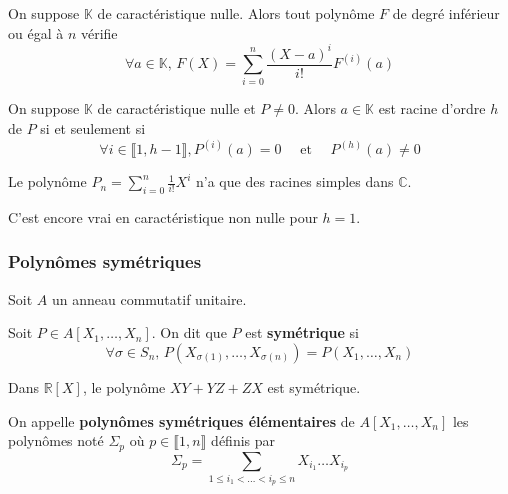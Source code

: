   \begin{theorem}
    On suppose $\mathbb{K}$ de caractéristique nulle. Alors tout polynôme $F$ de degré inférieur ou égal à $n$ vérifie
    \[ \forall a \in \mathbb{K}, \, F(X) = \sum_{i=0}^{n} \frac{(X-a)^i}{i!} F^{(i)}(a) \]
  \end{theorem}

  \begin{corollary}
    On suppose $\mathbb{K}$ de caractéristique nulle et $P \neq 0$. Alors $a \in \mathbb{K}$ est racine d'ordre $h$ de $P$ si et seulement si
    \[ \forall i \in \llbracket 1, h-1 \rrbracket, P^{(i)}(a) = 0 \quad \text{ et } \quad P^{(h)}(a) \neq 0 \]
  \end{corollary}

  \begin{example}
    Le polynôme $P_n = \sum_{i=0}^{n} \frac{1}{i!} X^{i}$ n'a que des racines simples dans $\mathbb{C}$.
  \end{example}

  \begin{remark}
    C'est encore vrai en caractéristique non nulle pour $h = 1$.
  \end{remark}

  \subsubsection{Polynômes symétriques}

  Soit $A$ un anneau commutatif unitaire.


  \begin{definition}
    Soit $P \in A[X_1, \dots, X_n]$. On dit que $P$ est \textbf{symétrique} si
    \[ \forall \sigma \in S_n, \, P(X_{\sigma(1)}, \dots, X_{\sigma(n)}) = P(X_1, \dots, X_n) \]
  \end{definition}

  \begin{example}
    Dans $\mathbb{R}[X]$, le polynôme $XY + YZ + ZX$ est symétrique.
  \end{example}

  \begin{definition}
    On appelle \textbf{polynômes symétriques élémentaires} de $A[X_1, \dots, X_n]$ les polynômes noté $\Sigma_p$ où $p \in \llbracket 1, n \rrbracket$ définis par
    \[ \Sigma_p = \sum_{1 \leq i_1 < \dots < i_p \leq n} X_{i_1} \dots X_{i_p} \]
  \end{definition}


